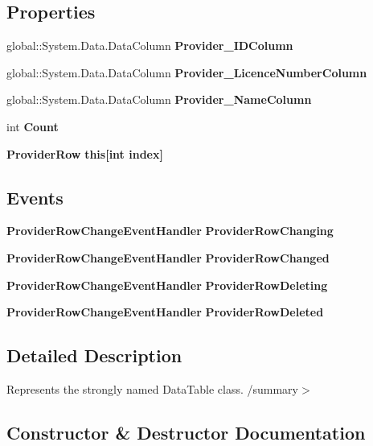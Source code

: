 \subsection*{Properties}
\begin{DoxyCompactItemize}
\item 
global\+::\+System.\+Data.\+Data\+Column \textbf{ Provider\+\_\+\+I\+D\+Column}\hspace{0.3cm}{\ttfamily  [get]}
\item 
global\+::\+System.\+Data.\+Data\+Column \textbf{ Provider\+\_\+\+Licence\+Number\+Column}\hspace{0.3cm}{\ttfamily  [get]}
\item 
global\+::\+System.\+Data.\+Data\+Column \textbf{ Provider\+\_\+\+Name\+Column}\hspace{0.3cm}{\ttfamily  [get]}
\item 
int \textbf{ Count}\hspace{0.3cm}{\ttfamily  [get]}
\item 
\textbf{ Provider\+Row} \textbf{ this[int index]}\hspace{0.3cm}{\ttfamily  [get]}
\end{DoxyCompactItemize}
\subsection*{Events}
\begin{DoxyCompactItemize}
\item 
\textbf{ Provider\+Row\+Change\+Event\+Handler} \textbf{ Provider\+Row\+Changing}
\item 
\textbf{ Provider\+Row\+Change\+Event\+Handler} \textbf{ Provider\+Row\+Changed}
\item 
\textbf{ Provider\+Row\+Change\+Event\+Handler} \textbf{ Provider\+Row\+Deleting}
\item 
\textbf{ Provider\+Row\+Change\+Event\+Handler} \textbf{ Provider\+Row\+Deleted}
\end{DoxyCompactItemize}


\subsection{Detailed Description}
Represents the strongly named Data\+Table class. /summary$>$ 

\subsection{Constructor \& Destructor Documentation}
\mbox{\label{class_a_f_h___scheduler_1_1_home_inspection_db_data_set_1_1_provider_data_table_a50375c3966cb01685e12033d30eb1feb}} 
